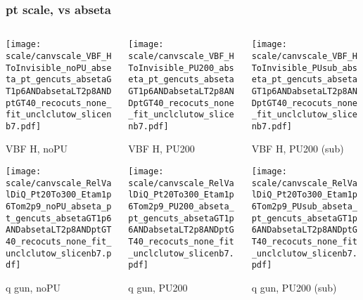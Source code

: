 \documentclass[8pt]{beamer}
\begin{document}
  \begin{frame}
  \frametitle{pt scale, vs abseta}
  
  \begin{columns}
   \begin{column}{0.35\textwidth}
     \texttt{[image: scale/canvscale\_VBF\_HToInvisible\_noPU\_abseta\_pt\_gencuts\_absetaGT1p6ANDabsetaLT2p8ANDptGT40\_recocuts\_none\_fit\_unclclutow\_slicenb7.pdf]}
     
     VBF H, noPU
    
     \texttt{[image: scale/canvscale\_RelValDiQ\_Pt20To300\_Etam1p6Tom2p9\_noPU\_abseta\_pt\_gencuts\_absetaGT1p6ANDabsetaLT2p8ANDptGT40\_recocuts\_none\_fit\_unclclutow\_slicenb7.pdf]}
     
     q gun, noPU
   \end{column}
   \begin{column}{0.35\textwidth}
     \texttt{[image: scale/canvscale\_VBF\_HToInvisible\_PU200\_abseta\_pt\_gencuts\_absetaGT1p6ANDabsetaLT2p8ANDptGT40\_recocuts\_none\_fit\_unclclutow\_slicenb7.pdf]}
     
     VBF H, PU200
    
     \texttt{[image: scale/canvscale\_RelValDiQ\_Pt20To300\_Etam1p6Tom2p9\_PU200\_abseta\_pt\_gencuts\_absetaGT1p6ANDabsetaLT2p8ANDptGT40\_recocuts\_none\_fit\_unclclutow\_slicenb7.pdf]}
     
     q gun, PU200
   \end{column}
   \begin{column}{0.35\textwidth}
     \texttt{[image: scale/canvscale\_VBF\_HToInvisible\_PUsub\_abseta\_pt\_gencuts\_absetaGT1p6ANDabsetaLT2p8ANDptGT40\_recocuts\_none\_fit\_unclclutow\_slicenb7.pdf]}
     
     VBF H, PU200 (sub)
    
     \texttt{[image: scale/canvscale\_RelValDiQ\_Pt20To300\_Etam1p6Tom2p9\_PUsub\_abseta\_pt\_gencuts\_absetaGT1p6ANDabsetaLT2p8ANDptGT40\_recocuts\_none\_fit\_unclclutow\_slicenb7.pdf]}
     
     q gun, PU200 (sub)
   \end{column}
  \end{columns}
 \end{frame}
 
\end{document}
